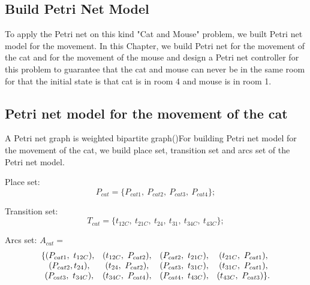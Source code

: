 \documentclass[11pt]{article}
\begin{document}
\begin{flushleft}
\section{Build Petri Net Model}
	To apply the Petri net on this kind "Cat and Mouse" problem, we built Petri net model for the movement. In this Chapter, we build Petri net for the movement of the cat and for the movement of the mouse and design a Petri net controller for this problem to guarantee that the cat and mouse can never be in the same room for that the initial state is that cat is in room 4 and mouse is in room 1.
	
	\subsection{Petri net model for the movement of the cat}
	A Petri net graph is weighted bipartite graph()For building Petri net model for the movement of the cat, we build place set, transition set and arcs set of the Petri net model.
	
	Place set: $$P_{cat}=\{P_{cat1},\ P_{cat2},\ P_{cat3},\ P_{cat4}\};$$
	
	Transition set: $$T_{cat}=\{t_{12C},\ t_{21C},\ t_{24},\ t_{31},\  t_{34C},\ t_{43C}\};$$
	
	Arcs set: $A_{cat}=$
	\begin{equation*}
	\begin{array}{*{4}c}
	\{(P_{cat1},\ t_{12C}), & (t_{12C},\ P_{cat2}), & (P_{cat2},\ t_{21C}), & (t_{21C},\ P_{cat1}),\\
	\ (P_{cat2}, t_{24}), & (t_{24},\ P_{cat2}), & (P_{cat3},\ t_{31C}), & (t_{31C},\ P_{cat1}),\\
	\ (P_{cat3},\ t_{34C}), & (t_{34C},\ P_{cat4}), & (P_{cat4},\ t_{43C}), & (t_{43C},\ P_{cat3})\}.
	\end{array}
	\end{equation*}
	
	

\end{flushleft}
\end{document}
